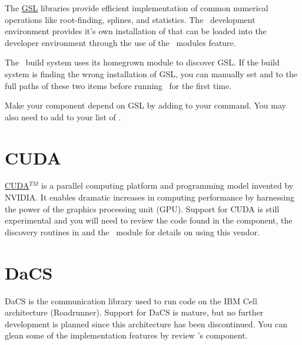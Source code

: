 The \href{http://www.gnu.org/software/gsl/}{GSL} libraries provide efficient implementation of common numerical operations like root-finding, splines, and statistics. The \draco\ development environment provides it's own installation of  that can be loaded into the developer environment through the use of the \draco\ modules feature.

The \draco\ build system uses its homegrown  module to discover GSL.  If the build system is finding the wrong installation of GSL, you can manually set  and  to the full paths of these two items before running \cmake\ for the first time.

Make your component depend on GSL by adding  to your  command.  You may also need to add  to your list of .


\section{CUDA}
\label{appsec:cuda}

\href{http://www.nvidia.com/object/cuda_home_new.html}{CUDA}$^{TM}$ is a parallel computing platform and programming model invented by NVIDIA. It enables dramatic increases in computing performance by harnessing the power of the graphics processing unit (GPU).  Support for CUDA is still experimental and you will need to review the code found in the  component, the discovery routines in  and the \cmake\ module  for details on using this vendor.


\section{DaCS}
\label{appsec:dacs}

DaCS is the communication library used to run code on the IBM Cell architecture (Roadrunner).  Support for DaCS is mature, but no further development is planned since this architecture has been discontinued.  You can glean some of the implementation features by review \draco's  component.


